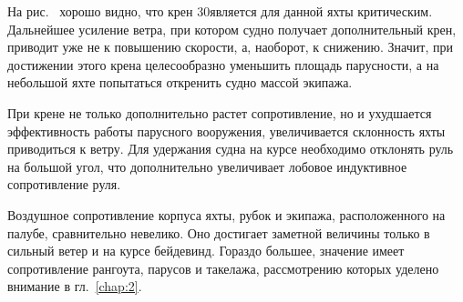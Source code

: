 На рис.~ хорошо видно, что крен 30\gr является для данной яхты критическим. Дальнейшее усиление ветра, при котором судно получает дополнительный крен, приводит уже не к повышению скорости, а, наоборот, к снижению. Значит, при достижении этого крена целесообразно уменьшить площадь парусности, а на небольшой яхте попытаться откренить судно массой экипажа.

При крене не только дополнительно растет сопротивление, но и ухудшается эффективность работы парусного вооружения, увеличивается склонность яхты приводиться к ветру. Для удержания судна на курсе необходимо отклонять руль на большой угол, что дополнительно увеличивает лобовое индуктивное сопротивление руля. 

Воздушное сопротивление корпуса яхты, рубок и экипажа, расположенного на палубе, сравнительно невелико. Оно достигает заметной величины только в сильный ветер и на курсе бейдевинд. Гораздо большее, значение имеет сопротивление рангоута, парусов и такелажа, рассмотрению которых уделено внимание в гл.~\ref{chap:2}.
